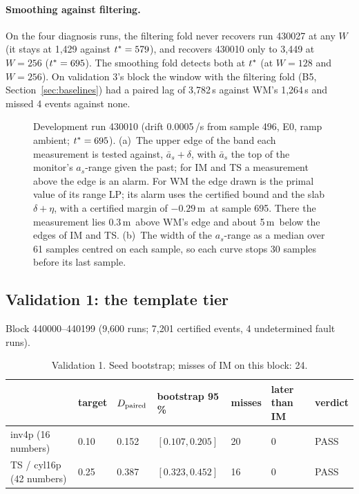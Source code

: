 \paragraph{Smoothing against filtering.} On the four diagnosis runs, the filtering fold never recovers run 430027 at
any $W$ (it stays at 1,429 against $t^{\ast} = 579$), and recovers 430010 only to 3,449 at $W = 256$ ($t^{\ast} = 695$). The
smoothing fold detects both at $t^{\ast}$ (at $W = 128$ and $W = 256$). On validation 3's block the window with the
filtering fold (B5, Section~\ref{sec:baselines}) had a paired lag of 3,782\,s against WM's 1,264\,s and missed 4
events against none.

\begin{figure}[t]
\centering

\caption{Development run 430010 (drift 0.0005\,\degC/s from sample 496, E0, ramp ambient; $t^{\ast} = 695$).
(a)~The upper edge of the band each measurement is tested against, $\bar a_s+\delta$, with $\bar a_s$ the top of the
monitor's $a_s$-range given the past; for IM and TS a measurement above the edge is an alarm. For WM the edge drawn is
the primal value of its range LP; its alarm uses the certified bound and the slab $\delta+\eta$, with a certified
margin of $-0.29$\,m\degC\ at sample 695. There the measurement lies 0.3\,m\degC\ above WM's edge and about
5\,m\degC\ below the edges of IM and TS. (b)~The width of the $a_s$-range as a median over 61 samples centred on each
sample, so each curve stops 30 samples before its last sample.}
\label{fig:trace}
\end{figure}

\subsection{Validation 1: the template tier}\label{sec:val1}

Block 440000--440199 (9,600 runs; 7,201 certified events, 4 undetermined fault runs).

\begin{table}[t]
\centering\small
\caption{Validation 1. Seed bootstrap; misses of IM on this block: 24.}\label{tab:val1}
\begin{tabular}{lllllll}
\toprule
 & target & $D_{\mathrm{paired}}$ & bootstrap 95\,\% & misses & later than IM & verdict\\
\midrule
inv4p (16 numbers) & 0.10 & 0.152 & $[0.107, 0.205]$ & 20 & 0 & PASS\\
TS / cyl16p (42 numbers) & 0.25 & 0.387 & $[0.323, 0.452]$ & 16 & 0 & PASS\\
\bottomrule
\end{tabular}
\end{table}

